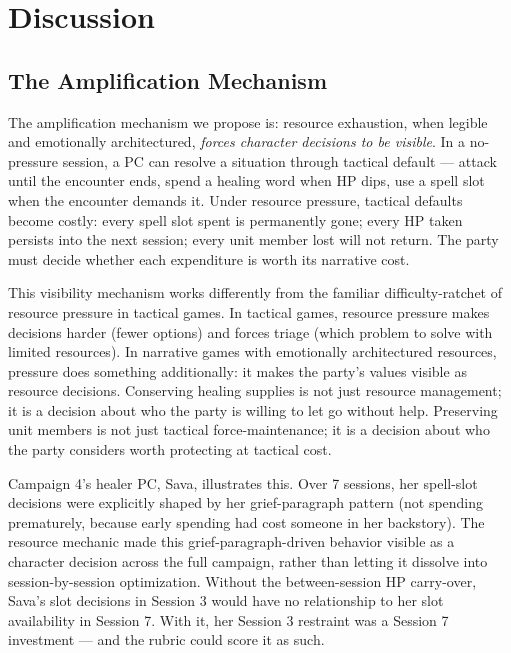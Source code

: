
\section{Discussion}
\label{sec:discussion}

\subsection{The Amplification Mechanism}

The amplification mechanism we propose is: resource exhaustion, when legible and
emotionally architectured, \textit{forces character decisions to be visible}. In a
no-pressure session, a PC can resolve a situation through tactical default --- attack
until the encounter ends, spend a healing word when HP dips, use a spell slot when
the encounter demands it. Under resource pressure, tactical defaults become costly:
every spell slot spent is permanently gone; every HP taken persists into the next
session; every unit member lost will not return. The party must decide whether each
expenditure is worth its narrative cost.

This visibility mechanism works differently from the familiar difficulty-ratchet of
resource pressure in tactical games. In tactical games, resource pressure makes
decisions harder (fewer options) and forces triage (which problem to solve with limited
resources). In narrative games with emotionally architectured resources, pressure does
something additionally: it makes the party's values visible as resource decisions.
Conserving healing supplies is not just resource management; it is a decision about who
the party is willing to let go without help. Preserving unit members is not just
tactical force-maintenance; it is a decision about who the party considers worth
protecting at tactical cost.

Campaign 4's healer PC, Sava, illustrates this. Over 7 sessions, her spell-slot decisions
were explicitly shaped by her grief-paragraph pattern (not spending prematurely,
because early spending had cost someone in her backstory). The resource mechanic
made this grief-paragraph-driven behavior visible as a character decision across the
full campaign, rather than letting it dissolve into session-by-session optimization.
Without the between-session HP carry-over, Sava's slot decisions in Session 3 would
have no relationship to her slot availability in Session 7. With it, her Session 3
restraint was a Session 7 investment --- and the rubric could score it as such.

